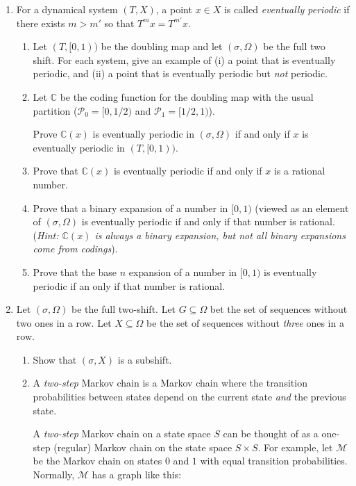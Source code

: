 \documentclass[letter]{article}
\newcommand{\setheader}[6]{
	\lhead{{\sc #1}\\{\sc #2} ({\small \it \today})}
	\rhead{
		{\bf #3} 
		\ifthenelse{\equal{#4}{}}{}{(#4)}\\
		{\bf #5} 
		\ifthenelse{\equal{#6}{}}{}{(#6)}%
	}
}
\newcommand{\C}{\mathbb{C}}
\begin{document}
	\setheader{MAT335}{Homework 4}{Due: 11:59pm April 9}{}{}{}

	\begin{enumerate}
		\item For a dynamical system $(T,X)$, a point $x\in X$ is called \emph{eventually periodic} if there 
			exists $m>m'$ so that $T^mx=T^{m'}x$.
		\begin{enumerate}
			\item Let $(T,[0,1))$ be the doubling map and let $(\sigma,\Omega)$ be the full two shift.
				For each system, give an example of (i) a point that is eventually periodic, and (ii)
				a point that is eventually periodic but \emph{not} periodic.
			\item Let $\C$ be the coding function for the doubling map with the usual partition ($\mathcal P_0=[0,1/2)$
				and $\mathcal P_1=[1/2,1)$).

				Prove $\C(x)$ is eventually periodic in $(\sigma, \Omega)$ if and only if $x$ is eventually
				periodic in $(T,[0,1))$.
			\item Prove that $\C(x)$ is eventually periodic if and only if $x$ is a rational number.
			\item Prove that a binary expansion of a number in $[0,1)$  (viewed as an element of $(\sigma, \Omega)$ 
				is eventually periodic if and only
				if that number is rational. (\emph{Hint: $\C(x)$ is always a binary expansion, but not all
				binary expansions come from codings}).
			\item Prove that the base $n$ expansion of a number in $[0,1)$ is eventually periodic if an only if that
				number is rational.
		\end{enumerate}

		\item Let $(\sigma, \Omega)$ be the full two-shift. Let $G\subseteq\Omega$ 
			bet the set of sequences without two ones in a row.
			Let $X\subseteq \Omega$ be the set of sequences without \emph{three} ones in a row.
			\begin{enumerate}
				\item Show that $(\sigma, X)$ is a subshift.
				\item A \emph{two-step} Markov chain is a Markov chain where the transition probabilities
					between states depend on the current state \emph{and} the previous state. 
					
					A \emph{two-step} Markov chain on a state space $S$ can be thought of as a 
					one-step (regular) Markov chain on the state space $S\times S$. For example, let
					$\mathcal M$ be the Markov
					chain on states $0$ and $1$ with equal transition probabilities.
					Normally, $\mathcal M$ has a graph like this:


\end{enumerate}
\end{enumerate}
\end{document}
